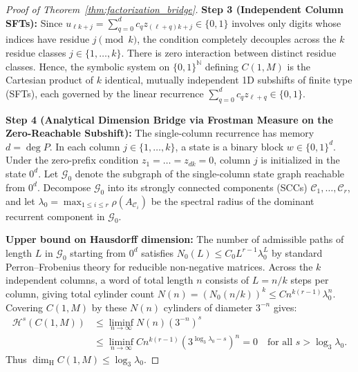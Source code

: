 \documentclass[11pt,reqno]{amsart}
\theoremstyle{plain}
\theoremstyle{definition}
\theoremstyle{remark}
\newcommand{\N}{\mathbb{N}}
\newcommand{\dimH}{\dim_{\mathrm{H}}}
\begin{document}
\begin{proof}[Proof of Theorem~\ref{thm:factorization_bridge}]
\textbf{Step 3 (Independent Column SFTs):}
Since $u_{\ell k + j} = \sum_{q=0}^d c_q z_{(\ell+q)k + j} \in \{0, 1\}$ involves only digits whose indices have residue $j \pmod k$, the condition completely decouples across the $k$ residue classes $j \in \{1, \dots, k\}$. There is zero interaction between distinct residue classes. Hence, the symbolic system on $\{0, 1\}^\N$ defining $C(1, M)$ is the Cartesian product of $k$ identical, mutually independent 1D subshifts of finite type (SFTs), each governed by the linear recurrence $\sum_{q=0}^d c_q z_{\ell+q} \in \{0, 1\}$.

\textbf{Step 4 (Analytical Dimension Bridge via Frostman Measure on the Zero-Reachable Subshift):}
The single-column recurrence has memory $d = \deg P$. In each column $j \in \{1, \dots, k\}$, a state is a binary block $w \in \{0, 1\}^d$. Under the zero-prefix condition $z_1 = \dots = z_{dk} = 0$, column $j$ is initialized in the state $0^d$. Let $\mathcal{G}_0$ denote the subgraph of the single-column state graph reachable from $0^d$.
Decompose $\mathcal{G}_0$ into its strongly connected components (SCCs) $\mathcal{C}_1, \dots, \mathcal{C}_r$, and let $\lambda_0 = \max_{1 \le i \le r} \rho(A_{\mathcal{C}_i})$ be the spectral radius of the dominant recurrent component in $\mathcal{G}_0$.

\textbf{Upper bound on Hausdorff dimension:}
The number of admissible paths of length $L$ in $\mathcal{G}_0$ starting from $0^d$ satisfies $N_0(L) \le C_0 L^{r-1} \lambda_0^L$ by standard Perron--Frobenius theory for reducible non-negative matrices. Across the $k$ independent columns, a word of total length $n$ consists of $L = n/k$ steps per column, giving total cylinder count $N(n) = (N_0(n/k))^k \le C n^{k(r-1)} \lambda_0^n$.
Covering $C(1, M)$ by these $N(n)$ cylinders of diameter $3^{-n}$ gives:
\begin{align*}
\mathcal{H}^s(C(1, M)) &\le \liminf_{n \to \infty} N(n) (3^{-n})^s \\
&\le \liminf_{n \to \infty} C n^{k(r-1)} (3^{\log_3 \lambda_0 - s})^n = 0 \quad \text{for all } s > \log_3 \lambda_0.
\end{align*}
Thus $\dimH C(1, M) \le \log_3 \lambda_0$.


\end{proof}
\end{document}
